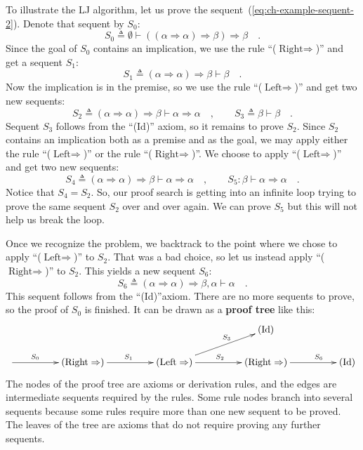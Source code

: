 To illustrate the LJ algorithm, let us prove the sequent~(\ref{eq:ch-example-sequent-2}).
Denote that sequent by $S_{0}$:
\[
S_{0}\triangleq\emptyset\vdash\left(\left(\alpha\Rightarrow\alpha\right)\Rightarrow\beta\right)\Rightarrow\beta\quad.
\]
 Since the goal of $S_{0}$ contains an implication, we use the rule
\textsf{``}($\text{Right}\Rightarrow$)\textsf{''} and get a sequent $S_{1}$:
\[
S_{1}\triangleq\left(\alpha\Rightarrow\alpha\right)\Rightarrow\beta\vdash\beta\quad.
\]
Now the implication is in the premise, so we use the rule \textsf{``}($\text{Left}\Rightarrow$)\textsf{''}
and get two new sequents:
\[
S_{2}\triangleq\left(\alpha\Rightarrow\alpha\right)\Rightarrow\beta\vdash\alpha\Rightarrow\alpha\quad,\quad\quad S_{3}\triangleq\beta\vdash\beta\quad.
\]
Sequent $S_{3}$ follows from the \textsf{``}(Id)\textsf{''} axiom, so it remains
to prove $S_{2}$. Since $S_{2}$ contains an implication both as
a premise and as the goal, we may apply either the rule \textsf{``}($\text{Left}\Rightarrow$)\textsf{''}
or the rule \textsf{``}($\text{Right}\Rightarrow$)\textsf{''}. We choose to apply
\textsf{``}($\text{Left}\Rightarrow$)\textsf{''} and get two new sequents:
\[
S_{4}\triangleq\left(\alpha\Rightarrow\alpha\right)\Rightarrow\beta\vdash\alpha\Rightarrow\alpha\quad,\quad\quad S_{5}:\beta\vdash\alpha\Rightarrow\alpha\quad.
\]
Notice that $S_{4}=S_{2}$. So, our proof search is getting into an
infinite loop trying to prove the same sequent $S_{2}$ over and over
again. We can prove $S_{5}$ but this will not help us break the loop.

Once we recognize the problem, we backtrack to the point where we
chose to apply \textsf{``}($\text{Left}\Rightarrow$)\textsf{''} to $S_{2}$. That
was a bad choice, so let us instead apply \textsf{``}($\text{Right}\Rightarrow$)\textsf{''}
to $S_{2}$. This yields a new sequent $S_{6}$:
\[
S_{6}\triangleq\left(\alpha\Rightarrow\alpha\right)\Rightarrow\beta,\alpha\vdash\alpha\quad.
\]
This sequent follows from the \textsf{``}(Id)\textsf{''}axiom. There are no more sequents
to prove, so the proof of $S_{0}$ is finished. It can be drawn as
a \textbf{proof tree} like this:
\[
\xymatrix{\xyScaleY{1.5pc}\xyScaleX{4pc} &  &  & (\text{Id})\\
\ar[r]\sp(0.35){S_{0}} & (\text{Right}\Rightarrow)\ar[r]\sp(0.5){S_{1}} & (\text{Left}\Rightarrow)\ar[r]\sp(0.5){S_{2}}\ar[ru]\sp(0.6){S_{3}} & (\text{Right}\Rightarrow)\ar[r]\sp(0.65){S_{6}} & (\text{Id})
}
\]
The nodes of the proof tree are axioms or derivation rules, and the
edges are intermediate sequents required by the rules. Some rule nodes
branch into several sequents because some rules require more than
one new sequent to be proved. The leaves of the tree are axioms that
do not require proving any further sequents. 

